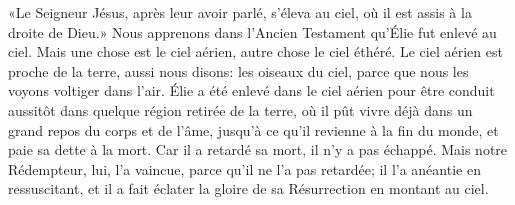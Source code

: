 «Le Seigneur Jésus, après leur avoir parlé, s’éleva au ciel,
	où il est assis à la droite de Dieu.»
Nous apprenons dans l’Ancien Testament qu’Élie fut enlevé au ciel.
	Mais une chose est le ciel aérien, autre chose le ciel éthéré.
Le ciel aérien est proche de la terre,
	aussi nous disons: les oiseaux du ciel,
	parce que nous les voyons voltiger dans l’air.
Élie a été enlevé dans le ciel aérien
	pour être conduit aussitôt dans quelque région retirée de la terre,
	où il pût vivre déjà dans un grand repos du corps et de l’âme,
	jusqu’à ce qu’il revienne à la fin du monde,
	et paie sa dette à la mort.
Car il a retardé sa mort, il n’y a pas échappé.
Mais notre Rédempteur, lui, l’a vaincue, parce qu’il ne l’a pas retardée;
	il l’a anéantie en ressuscitant,
	et il a fait éclater la gloire de sa Résurrection en montant au ciel.
